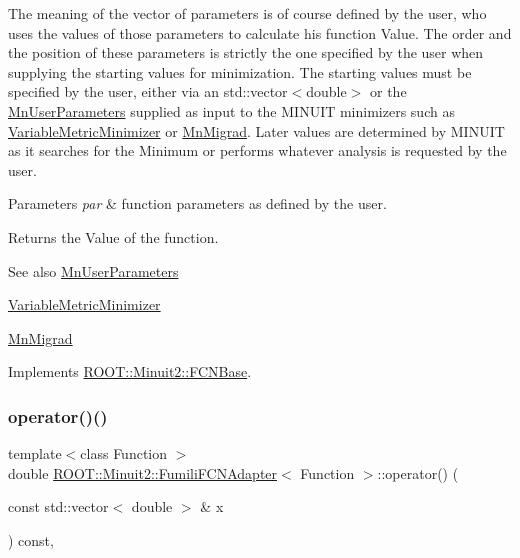 The meaning of the vector of parameters is of course defined by the user, who uses the values of those parameters to calculate his function Value. The order and the position of these parameters is strictly the one specified by the user when supplying the starting values for minimization. The starting values must be specified by the user, either via an std\+::vector$<$double$>$ or the \mbox{\hyperlink{classROOT_1_1Minuit2_1_1MnUserParameters}{Mn\+User\+Parameters}} supplied as input to the M\+I\+N\+U\+IT minimizers such as \mbox{\hyperlink{classROOT_1_1Minuit2_1_1VariableMetricMinimizer}{Variable\+Metric\+Minimizer}} or \mbox{\hyperlink{classROOT_1_1Minuit2_1_1MnMigrad}{Mn\+Migrad}}. Later values are determined by M\+I\+N\+U\+IT as it searches for the Minimum or performs whatever analysis is requested by the user.


\begin{DoxyParams}{Parameters}
{\em par} & function parameters as defined by the user.\\
\hline
\end{DoxyParams}
\begin{DoxyReturn}{Returns}
the Value of the function.
\end{DoxyReturn}
\begin{DoxySeeAlso}{See also}
\mbox{\hyperlink{classROOT_1_1Minuit2_1_1MnUserParameters}{Mn\+User\+Parameters}} 

\mbox{\hyperlink{classROOT_1_1Minuit2_1_1VariableMetricMinimizer}{Variable\+Metric\+Minimizer}} 

\mbox{\hyperlink{classROOT_1_1Minuit2_1_1MnMigrad}{Mn\+Migrad}} 
\end{DoxySeeAlso}


Implements \mbox{\hyperlink{classROOT_1_1Minuit2_1_1FCNBase_ae4a86bd94d0d0f5ca6fc8f8ab2bb43cd}{R\+O\+O\+T\+::\+Minuit2\+::\+F\+C\+N\+Base}}.

\mbox{\label{classROOT_1_1Minuit2_1_1FumiliFCNAdapter_a7381e9f93fbec9e0504e3e340c281056}} 
\subsubsection{\texorpdfstring{operator()()}{operator()()}\hspace{0.1cm}{\footnotesize\ttfamily [2/6]}}
{\footnotesize\ttfamily template$<$class Function $>$ \\
double \mbox{\hyperlink{classROOT_1_1Minuit2_1_1FumiliFCNAdapter}{R\+O\+O\+T\+::\+Minuit2\+::\+Fumili\+F\+C\+N\+Adapter}}$<$ Function $>$\+::operator() (\begin{DoxyParamCaption}\item[{const std\+::vector$<$ double $>$ \&}]{x }\end{DoxyParamCaption}) const\hspace{0.3cm}{\ttfamily [inline]}, {\ttfamily [virtual]}}

